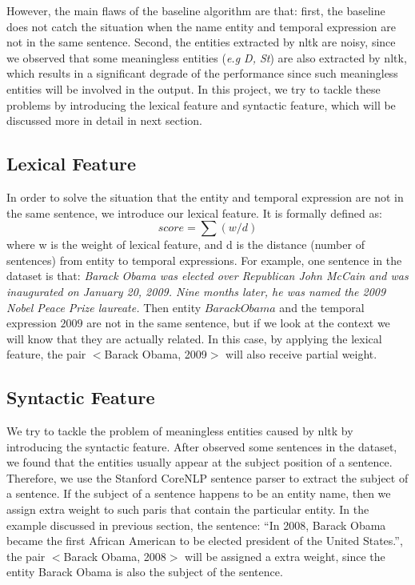 \documentclass[12pt,a4paper]{article}
\begin{document}
However, the main flaws of the baseline algorithm are that: first, the baseline does not catch the situation when the name entity and temporal expression are not in the same sentence. Second, the entities extracted by nltk are noisy, since we observed that some meaningless entities (\textit{e.g D, St}) are also extracted by nltk, which results in a significant degrade of the performance since such meaningless entities will be involved in the output. In this project, we try to tackle these problems by introducing the lexical feature and syntactic feature, which will be discussed more in detail in next section. 


\subsection{Lexical Feature}
In order to solve the situation that the entity and temporal expression are not in the same sentence, we introduce our lexical feature. It is formally defined as: \newline
\[score = \sum (w / d )\]
 \newline
where w is the weight of lexical feature, and d is the distance (number of sentences) from entity to temporal expressions. For example, one sentence in the dataset is that: \textit{Barack Obama was elected over Republican John McCain and was inaugurated on January 20, 2009. Nine months later, he was named the 2009 Nobel Peace Prize laureate.} Then entity $Barack Obama$ and the temporal expression $2009$ are not in the same sentence, but if we look at the context we will know that they are actually related. In this case, by applying the lexical feature, the pair $<$Barack Obama, 2009$>$ will also receive partial weight. 	

\subsection{Syntactic Feature}	
We try to tackle the problem of meaningless entities caused by nltk by introducing the syntactic feature. After observed some sentences in the dataset, we found that the entities usually appear at the subject position of a sentence. Therefore, we use the Stanford CoreNLP sentence parser \cite{corenlp} to extract the subject of a sentence. If the subject of a sentence happens to be an entity name, then we assign extra weight to such paris that contain the particular entity. In the example discussed in previous section, the sentence: “In 2008, Barack Obama became the first African American to be elected president of the United States.”, the pair $<$Barack Obama, 2008$>$ will be assigned a extra weight, since the entity Barack Obama is also the subject of the sentence. 
\end{document}
